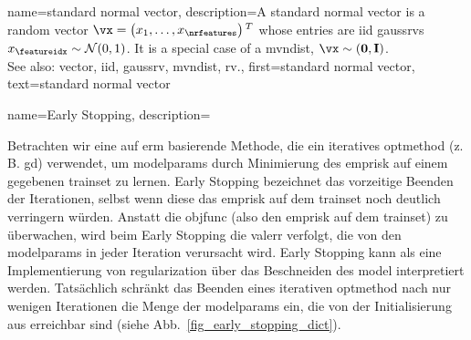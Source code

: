 {{{{
{name={standard normal vector}, 
	description={A standard normal \gls{vector} is a random 
		\gls{vector} $\vx=\big(x_{1}, \ldots, x_{\nrfeatures}\big)\,^{T}$ 
		whose entries are \gls{iid} \glspl{gaussrv} $x_{\featureidx} \sim \mathcal{N}(0,1)$. 
		It is a special case of a \gls{mvndist}, $\vx \sim \mathcal(\mathbf{0},\mathbf{I})$.
		\\ 
		See also: \gls{vector}, \gls{iid}, \gls{gaussrv}, \gls{mvndist}, \gls{rv}.}, 
	first={standard normal vector},
	text={standard normal vector}
}


{
    name={Early Stopping}, 
    description={Betrachten wir eine auf \gls{erm} basierende Methode, die ein 
        iteratives \gls{optmethod} (z.\,B. \gls{gd}) verwendet, um \glspl{modelparam} 
        durch Minimierung des \gls{emprisk} auf einem gegebenen \gls{trainset} zu lernen. 
        Early Stopping  bezeichnet das vorzeitige Beenden der Iterationen, 
        selbst wenn diese das \gls{emprisk} auf dem \gls{trainset} noch deutlich verringern würden. 
        Anstatt die \gls{objfunc} (also den \gls{emprisk} auf dem \gls{trainset}) zu überwachen, 
        wird beim Early Stopping die \gls{valerr} verfolgt, die von den \glspl{modelparam} in jeder Iteration 
        verursacht wird. Early Stopping kann als eine Implementierung von \gls{regularization} 
        über das Beschneiden des \gls{model} interpretiert werden. Tatsächlich schränkt das Beenden 
        eines iterativen \gls{optmethod} nach nur wenigen Iterationen die Menge der \glspl{modelparam} 
        ein, die von der Initialisierung aus erreichbar sind (siehe Abb.\ \ref{fig_early_stopping_dict}).
        \begin{figure}[htbp]
        \centering
\end{figure}}}}}}}
